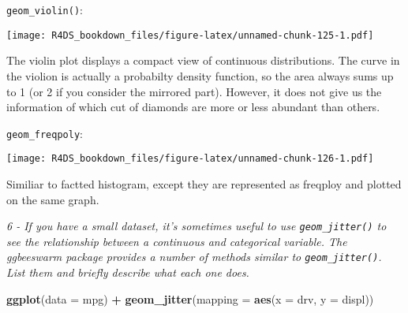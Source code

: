\documentclass[]{article}
\newenvironment{Shaded}{\begin{snugshade}}{\end{snugshade}}
\newcommand{\KeywordTok}[1]{\textcolor[rgb]{0.13,0.29,0.53}{\textbf{#1}}}
\newcommand{\DataTypeTok}[1]{\textcolor[rgb]{0.13,0.29,0.53}{#1}}
\newcommand{\DecValTok}[1]{\textcolor[rgb]{0.00,0.00,0.81}{#1}}
\newcommand{\StringTok}[1]{\textcolor[rgb]{0.31,0.60,0.02}{#1}}
\newcommand{\OperatorTok}[1]{\textcolor[rgb]{0.81,0.36,0.00}{\textbf{#1}}}
\newcommand{\NormalTok}[1]{#1}
\theoremstyle{definition}
\theoremstyle{definition}
\theoremstyle{definition}
\theoremstyle{remark}
\begin{document}
\texttt{geom\_violin()}:

\begin{Shaded}
\end{Shaded}

\texttt{[image: R4DS\_bookdown\_files/figure-latex/unnamed-chunk-125-1.pdf]}

The violin plot displays a compact view of continuous distributions. The
curve in the violion is actually a probabilty density function, so the
area always sums up to 1 (or 2 if you consider the mirrored part).
However, it does not give us the information of which cut of diamonds
are more or less abundant than others.

\texttt{geom\_freqpoly}:

\begin{Shaded}
\end{Shaded}

\texttt{[image: R4DS\_bookdown\_files/figure-latex/unnamed-chunk-126-1.pdf]}

Similiar to factted histogram, except they are represented as freqploy
and plotted on the same graph.

\emph{6 - If you have a small dataset, it's sometimes useful to use
\texttt{geom\_jitter()} to see the relationship between a continuous and
categorical variable. The ggbeeswarm package provides a number of
methods similar to \texttt{geom\_jitter()}. List them and briefly
describe what each one does.}

\begin{Shaded}
\begin{Highlighting}[]
\KeywordTok{ggplot}\NormalTok{(}\DataTypeTok{data =}\NormalTok{ mpg) }\OperatorTok{+}\StringTok{ }
\StringTok{  }\KeywordTok{geom_jitter}\NormalTok{(}\DataTypeTok{mapping =} \KeywordTok{aes}\NormalTok{(}\DataTypeTok{x =}\NormalTok{ drv, }\DataTypeTok{y =}\NormalTok{ displ))}
\end{Highlighting}
\end{Shaded}
\end{document}
